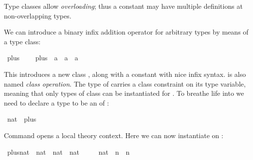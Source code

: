 %
\begin{isabellebody}%
\def\isabellecontext{Overloading}%
%
\isadelimtheory
%
\endisadelimtheory
%
\isatagtheory
%
\endisatagtheory
{\isafoldtheory}%
%
\isadelimtheory
%
\endisadelimtheory
%
\begin{isamarkuptext}%
Type classes allow \emph{overloading}; thus a constant may
have multiple definitions at non-overlapping types.%
\end{isamarkuptext}%
\isamarkuptrue%
%
\isamarkuptrue%
%
\begin{isamarkuptext}%
We can introduce a binary infix addition operator \isa{{\isasymotimes}}
for arbitrary types by means of a type class:%
\end{isamarkuptext}%
\isamarkuptrue%
\isamarkupfalse%
\ plus\ {\isacharequal}\isanewline
\ \ \ plus\ {\isacharcolon}{\isacharcolon}\ {\isachardoublequoteopen}{\isacharprime}a\ {\isasymRightarrow}\ {\isacharprime}a\ {\isasymRightarrow}\ {\isacharprime}a{\isachardoublequoteclose}\ {\isacharparenleft}\ {\isachardoublequoteopen}{\isasymoplus}{\isachardoublequoteclose}\ {}{}{\isacharparenright}%
\begin{isamarkuptext}%
\noindent This introduces a new class ,
along with a constant  with nice infix syntax.
 is also named \emph{class operation}.  The type
of  carries a class constraint  on its type variable, meaning that only types of class
 can be instantiated for .
To breathe life into  we need to declare a type
to be an  of :%
\end{isamarkuptext}%
\isamarkuptrue%
\isamarkupfalse%
\ nat\ {\isacharcolon}{\isacharcolon}\ plus\isanewline
{}%
\begin{isamarkuptext}%
\noindent Command  opens a local
theory context.  Here we can now instantiate  on
:%
\end{isamarkuptext}%
\isamarkuptrue%
\isamarkupfalse%
\ plus{\isacharunderscore}nat\ {\isacharcolon}{\isacharcolon}\ {\isachardoublequoteopen}nat\ {\isasymRightarrow}\ nat\ {\isasymRightarrow}\ nat{\isachardoublequoteclose}\ \isanewline
\ \ \ \ {\isachardoublequoteopen}{\isacharparenleft}{}{\isacharcolon}{\isacharcolon}nat{\isacharparenright}\ {\isasymoplus}\ n\ {\isacharequal}\ n{\isachardoublequoteclose}\isanewline

\end{isabellebody}
